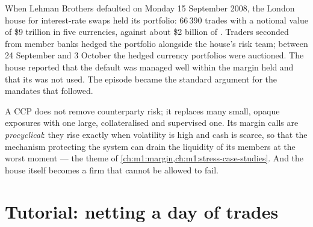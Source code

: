 \begin{example}[September 2008]\label{ex:m1:clearing-and-settlement:lehman}
When Lehman Brothers defaulted on Monday 15 September 2008, the London
 house for interest-rate swaps held its portfolio: 66\,390 trades
with a notional value of \$9 trillion in five currencies, against about \$2
billion of . Traders seconded from member banks hedged the
portfolio alongside the  house's risk team; between 24 September and
3 October the hedged currency portfolios were auctioned. The  house
reported that the default was managed well within the margin held and that
its  was not used. The episode became the standard argument for
the  mandates that followed.
\end{example}

\begin{remark}\label{rem:m1:clearing-and-settlement:concentration}
A CCP does not remove counterparty risk; it replaces many small, opaque
exposures with one large, collateralised and supervised one. Its margin
calls are \emph{procyclical}: they rise exactly when volatility is high and
cash is scarce, so that the mechanism protecting the system can drain the
liquidity of its members at the worst moment --- the theme of
\cref{ch:m1:margin,ch:m1:stress-case-studies}. And the  house itself
becomes a firm that cannot be allowed to fail.
\end{remark}

\section{Tutorial: netting a day of trades}\label{tut:m1:clearing-and-settlement:netting}

